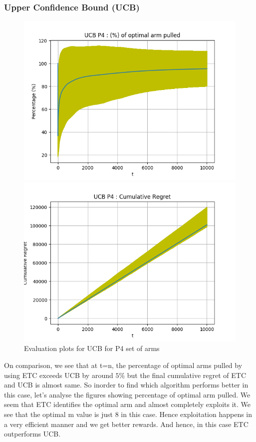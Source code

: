 \documentclass[12pt]{report}
\begin{document}
		\subsubsection{Upper Confidence Bound (UCB)}
			\begin{figure}[H]
				\begin{multicols}{2}
					\includegraphics[scale=0.5]{Figures/UCB_P4_op.png} \par
					\includegraphics[scale=0.5]{Figures/UCB_P4_ret.png}
				\end{multicols}
				\caption{Evaluation plots for UCB for P4 set of arms}
				\label{Fig7}
			\end{figure}	
			
		\noindent On comparison, we see that at t=n, the percentage of optimal arms pulled by using ETC exceeds UCB by around $5\%$	but the final cumulative regret of ETC and UCB is almost same. So inorder to find which algorithm performs better in this case, let's analyse the figures showing percentage of optimal arm pulled. We seem that ETC identifies the optimal arm and almost completely exploits it. We see that the optimal m value is just 8 in this case. Hence exploitation happens in a very efficient manner and we get better rewards. And hence, in this case ETC outperforms UCB.
			
\end{document}
